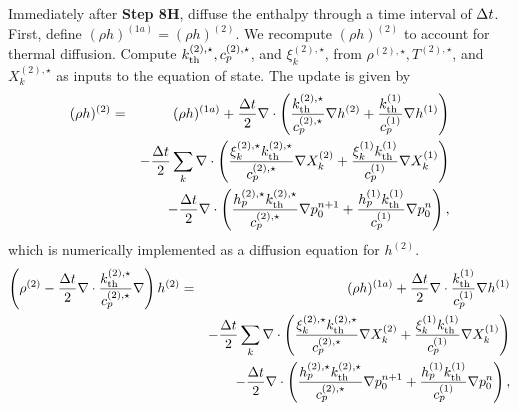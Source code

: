 Immediately after {\bf Step 8H}, diffuse the enthalpy through a time interval of 
$\Delta t$.  First, define $(\rho h)^{(1a)} = (\rho h)^{(2)}$.  We recompute $(\rho h)^{(2)}$ to 
account for thermal diffusion.  Compute $k_{\rm th}^{(2),\star}, c_p^{(2),\star}$, and 
$\xi_k^{(2),\star}$, from $\rho^{(2),\star}, T^{(2),\star}$, and $X_k^{(2),\star}$ as inputs to 
the equation of state.  The update is given by
\begin{eqnarray}
(\rho h)^{(2)} &=& (\rho h)^{(1a)} + \frac{\Delta t}{2}\nabla\cdot\left(\frac{k_{\rm th}^{(2),\star}}{c_p^{(2),\star}}\nabla h^{(2)} + \frac{k_{\rm th}^{(1)}}{c_p^{(1)}}\nabla h^{(1)}\right)\nonumber\\
&&- \frac{\Delta t}{2}\sum_k\nabla\cdot\left(\frac{\xi_k^{(2),\star}k_{\rm th}^{(2),\star}}{c_p^{(2),\star}}\nabla X_k^{(2)} + \frac{\xi_k^{(1)}k_{\rm th}^{(1)}}{c_p^{(1)}}\nabla X_k^{(1)}\right)\nonumber\\
&&- \frac{\Delta t}{2}\nabla\cdot\left(\frac{h_p^{(2),\star}k_{\rm th}^{(2),\star}}{c_p^{(2),\star}}\nabla p_0^{n+1} + \frac{h_p^{(1)}k_{\rm th}^{(1)}}{c_p^{(1)}}\nabla p_0^{n}\right),
\end{eqnarray}
which is numerically implemented as a diffusion equation for $h^{(2)}$.
\begin{eqnarray}
\left(\rho^{(2)} - \frac{\Delta t}{2}\nabla\cdot\frac{k_{\rm th}^{(2),\star}}{c_p^{(2),\star}}\nabla\right)h^{(2)} &=& (\rho h)^{(1a)} + \frac{\Delta t}{2}\nabla\cdot\frac{k_{\rm th}^{(1)}}{c_p^{(1)}}\nabla h^{(1)}\nonumber\\
&&- \frac{\Delta t}{2}\sum_k\nabla\cdot\left(\frac{\xi_k^{(2),\star}k_{\rm th}^{(2),\star}}{c_p^{(2),\star}}\nabla X_k^{(2)} + \frac{\xi_k^{(1)}k_{\rm th}^{(1)}}{c_p^{(1)}}\nabla X_k^{(1)}\right)\nonumber\\
&&- \frac{\Delta t}{2}\nabla\cdot\left(\frac{h_p^{(2),\star}k_{\rm th}^{(2),\star}}{c_p^{(2),\star}}\nabla p_0^{n+1} + \frac{h_p^{(1)}k_{\rm th}^{(1)}}{c_p^{(1)}}\nabla p_0^{n}\right),
\end{eqnarray}



